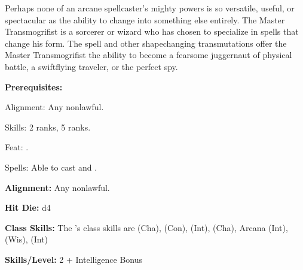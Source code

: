 
Perhaps none of an arcane spellcaster’s mighty powers is so versatile, useful, or spectacular as the ability to change into something else entirely. The Master Transmogrifist is a sorcerer or wizard who has chosen to specialize in spells that change his form. The  spell and other shapechanging transmutations offer the Master Transmogrifist the ability to become a fearsome juggernaut of physical battle, a swiftflying traveler, or the perfect spy.

\textbf{Prerequisites:} 
\begin{description*}
\item[\hspace*{1.5cm}Alignment:] Any nonlawful.
\item[\hspace*{1.5cm}Skills:]  2 ranks,  5 ranks.
\item[\hspace*{1.5cm}Feat:] .
\item[\hspace*{1.5cm}Spells:] Able to cast  and .
\end{description*}

\textbf{Alignment:} Any nonlawful.

\textbf{Hit Die:} d4

\textbf{Class Skills:} The \currentclassname{}'s class skills are  (Cha),  (Con),  (Int),  (Cha),  Arcana (Int),  (Wis),  (Int)

\textbf{Skills/Level:} 2 + Intelligence Bonus

\poorbab{}
\poorfor{}
\poorref{}
\goodwil{}

